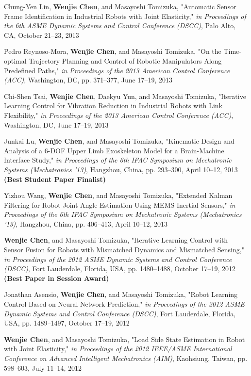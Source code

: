 \documentclass[UTF8,nofonts]{res}
\begin{document}
\begin{resume}
\begin{etaremune}[start=26]
    \item Chung-Yen Lin, \textbf{Wenjie Chen}, and Masayoshi Tomizuka, "Automatic Sensor Frame Identification in Industrial Robots with Joint Elasticity," \emph{in Proceedings of the 6th ASME Dynamic Systems and Control Conference (DSCC)}, Palo Alto, CA, October 21--23, 2013
    \item Pedro Reynoso-Mora, \textbf{Wenjie Chen}, and Masayoshi Tomizuka, "On the Time-optimal Trajectory Planning and Control of Robotic Manipulators Along Predefined Paths," \emph{in Proceedings of the 2013 American Control Conference (ACC)}, Washington, DC, pp. 371--377, June 17--19, 2013
    \item Chi-Shen Tsai, \textbf{Wenjie Chen}, Daekyu Yun, and Masayoshi Tomizuka, "Iterative Learning Control for Vibration Reduction in Industrial Robots with Link Flexibility," \emph{in Proceedings of the 2013 American Control Conference (ACC)}, Washington, DC, June 17--19, 2013
    \item Junkai Lu, \textbf{Wenjie Chen}, and Masayoshi Tomizuka, "Kinematic Design and Analysis of a 6-DOF Upper Limb Exoskeleton Model for a Brain-Machine Interface Study," \emph{in Proceedings of the 6th IFAC Symposium on Mechatronic Systems (Mechatronics '13)}, Hangzhou, China, pp. 293--300, April 10--12, 2013 \textbf{(Best Student Paper Finalist)}
    \item Yizhou Wang, \textbf{Wenjie Chen}, and Masayoshi Tomizuka, "Extended Kalman Filtering for Robot Joint Angle Estimation Using MEMS Inertial Sensors,"  \emph{in Proceedings of the 6th IFAC Symposium on Mechatronic Systems (Mechatronics '13)}, Hangzhou, China, pp. 406--413, April 10--12, 2013
    \item \textbf{Wenjie Chen}, and Masayoshi Tomizuka, "Iterative Learning Control with Sensor Fusion for Robots with Mismatched Dynamics and Mismatched Sensing," \emph{in Proceedings of the 2012 ASME Dynamic Systems and Control Conference (DSCC)}, Fort Lauderdale, Florida, USA, pp. 1480--1488, October 17--19, 2012 \textbf{(Best Paper in Session Award)}
    \item Jonathan Asensio, \textbf{Wenjie Chen}, and Masayoshi Tomizuka, "Robot Learning Control Based on Neural Network Prediction," \emph{in Proceedings of the 2012 ASME Dynamic Systems and Control Conference (DSCC)}, Fort Lauderdale, Florida, USA, pp. 1489--1497, October 17--19, 2012
    \item \textbf{Wenjie Chen}, and Masayoshi Tomizuka, "Load Side State Estimation in Robot with Joint Elasticity," \emph{in Proceedings of the 2012 IEEE/ASME International Conference on Advanced Intelligent Mechatronics (AIM)}, Kaohsiung, Taiwan, pp. 598--603, July 11--14, 2012

\end{etaremune}
\end{resume}
\end{document}

